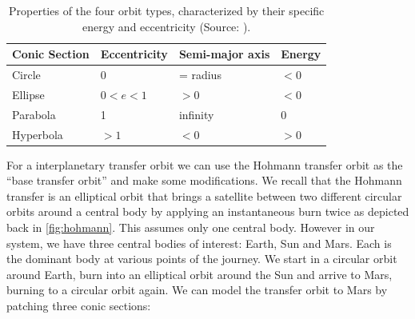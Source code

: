 \begin{table}[tbp]
    \centering
    \begin{tabular}{@{}llll@{}}
    \toprule
    Conic Section & Eccentricity    & Semi-major axis & Energy  \\ \midrule
    Circle        & $0$             & = radius        & $<0$    \\
    Ellipse       & $0 < e < 1$     & $>0$            & $<0$    \\
    Parabola      & 1               & infinity        & $0$     \\
    Hyperbola     & $>1$            & $<0$            & $>0$    \\ \bottomrule
    \end{tabular}
    \caption{Properties of the four orbit types, characterized by their specific energy and eccentricity (Source: \cite{Braeunig}).}
    \label{tab:orbit-type-properties}
\end{table}


For a interplanetary transfer orbit we can use the Hohmann transfer orbit as the ``base transfer orbit'' and make some modifications. We recall that the Hohmann transfer is an elliptical orbit that brings a satellite between two different circular orbits around a central body by applying an instantaneous burn twice as depicted back in \cref{fig:hohmann}. This assumes only one central body. However in our system, we have three central bodies of interest: Earth, Sun and Mars. Each is the dominant body at various points of the journey. We start in a circular orbit around Earth, burn into an elliptical orbit around the Sun and arrive to Mars, burning to a circular orbit again. We can model the transfer orbit to Mars by patching three conic sections:

